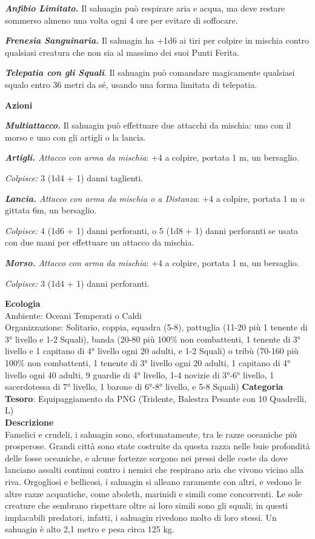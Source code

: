 \begin{multicols}{2}
{\emph{\textbf{Anfibio Limitato.}} Il sahuagin può respirare aria e acqua, ma deve restare sommerso almeno una volta ogni 4 ore per evitare di soffocare.

\emph{\textbf{Frenesia Sanguinaria.}} Il sahuagin ha +1d6 ai tiri per colpire in mischia contro qualsiasi creatura che non sia al massimo dei suoi Punti Ferita.

\emph{\textbf{Telepatia con gli Squali}}. Il sahuagin può comandare magicamente qualsiasi squalo entro 36 metri da sé, usando una forma limitata di telepatia.

\textbf{Azioni}

\emph{\textbf{Multiattacco.}} Il sahuagin può effettuare due attacchi da mischia: uno con il morso e uno con gli artigli o la lancia.

\emph{\textbf{Artigli.} Attacco con arma da mischia}: +4 a colpire, portata 1 m, un bersaglio.

\emph{Colpisce:} 3 (1d4 + 1) danni taglienti.

\emph{\textbf{Lancia.} Attacco con arma da mischia o a Distanza}: +4 a colpire, portata 1 m o gittata 6m, un bersaglio.

\emph{Colpisce:} 4 (1d6 + 1) danni perforanti, o 5 (1d8 + 1) danni perforanti se usata con due mani per effettuare un attacco da mischia.

\emph{\textbf{Morso.} Attacco con arma da mischia}: +4 a colpire, portata 1 m, un bersaglio.

\emph{Colpisce:} 3 (1d4 + 1) danni perforanti.

\textbf{Ecologia}\\
Ambiente: Oceani Temperati o Caldi\\
Organizzazione: Solitario, coppia, squadra (5-8), pattuglia (11-20 più 1 tenente di 3° livello e 1-2 Squali), banda (20-80 più 100\% non combattenti, 1 tenente di 3° livello e 1 capitano di 4° livello ogni 20 adulti, e 1-2 Squali) o tribù (70-160 più 100\% non combattenti, 1 tenente di 3° livello ogni 20 adulti, 1 capitano di 4° livello ogni 40 adulti, 9 guardie di 4° livello, 1-4 novizie di 3°-6° livello, 1 sacerdotessa di 7° livello, 1 barone di 6°-8° livello, e 5-8 Squali)
\textbf{Categoria Tesoro}: Equipaggiamento da PNG (Tridente, Balestra Pesante con 10 Quadrelli, L)\\
\textbf{Descrizione}\\
Famelici e crudeli, i sahuagin sono, sfortunatamente, tra le razze oceaniche più prosperose. Grandi città sono state costruite da questa razza nelle buie profondità delle fosse oceaniche, e alcune fortezze sorgono nei pressi delle coste da dove lanciano assalti continui contro i nemici che respirano aria che vivono vicino alla riva. Orgogliosi e bellicosi, i sahuagin si alleano raramente con altri, e vedono le altre razze acquatiche, come aboleth, marinidi e simili come concorrenti. Le sole creature che sembrano rispettare oltre ai loro simili sono gli squali; in questi implacabili predatori, infatti, i sahuagin rivedono molto di loro stessi. Un sahuagin è alto 2,1 metro e pesa circa 125 kg.

}
\end{multicols}
